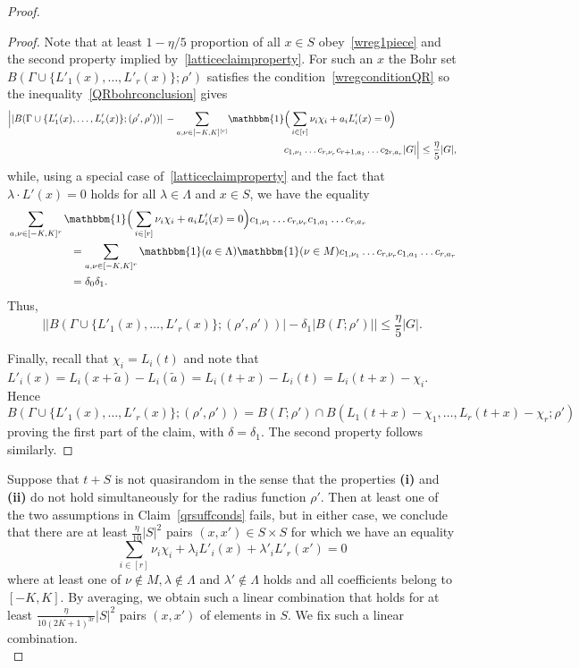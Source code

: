 \documentclass[a4paper,11pt]{article}
\numberwithin{theorem}{section}
\theoremstyle{definition}
\newcommand\id{\mathbbm{1}}
\begin{document}
\begin{proof}
\begin{proof}
Note that at least $1-\eta/5$ proportion of all $x \in S$ obey~\eqref{wreg1piece} and the second property implied by~\eqref{latticeclaimproperty}. For such an $x$ the Bohr set $B(\Gamma \cup \{L'_1(x), \dots, L'_r(x)\}; \rho')$ satisfies the condition~\eqref{wregconditionQR} so the inequality~\eqref{QRbohrconclusion} gives
\begin{align*}\Big||B(\Gamma \cup \{L'_1(x), \dots, L'_r(x)\}; (\rho', \rho'))|\, - \sum_{a, \nu \in [-K, K]^{[r]}} &\id\Big(\sum_{i \in [r]} \nu_i \chi_i + a_i L'_i(x) = 0\Big)\\
&\hspace{2cm} c_{1, \nu_1} \dots c_{r, \nu_r} c_{r+ 1, a_1} \dots c_{2r, a_r} |G|\Big| \leq \frac{\eta}{5}|G|,\end{align*}
while, using a special case of~\eqref{latticeclaimproperty} and the fact that $\lambda \cdot L'(x) = 0$ holds for all $\lambda \in \Lambda$ and $x \in S$, we have the equality
\begin{align*}&\sum_{a ,\nu\in [-K, K]^r} \id\Big(\sum_{i \in [r]} \nu_i \chi_i + a_i L'_i(x) = 0\Big) c_{1, \nu_1} \dots c_{r, \nu_r} c_{1, a_1} \dots c_{r, a_r} \\
&\hspace{2cm}=\sum_{a, \nu\in [-K, K]^r} \id(a \in \Lambda) \id(\nu \in M) c_{1, \nu_1} \dots c_{r, \nu_r} c_{1, a_1} \dots c_{r, a_r}\\
&\hspace{2cm}= \delta_0 \delta_1.\end{align*}
Thus,
\[\Big||B(\Gamma \cup \{L'_1(x), \dots, L'_r(x)\}; (\rho', \rho'))| - \delta_1|B(\Gamma; \rho')|\Big| \leq \frac{\eta}{5}|G|.\]

Finally, recall that $\chi_i = L_i(t)$ and note that $L'_i(x) = L_i(x + \tilde{a}) - L_i(\tilde{a}) = L_i(t + x) - L_i(t) = L_i(t + x) - \chi_i$. Hence
\[B(\Gamma \cup \{L'_1(x), \dots, L'_r(x)\}; (\rho', \rho')) = B(\Gamma; \rho') \cap B(L_1(t + x)-\chi_1, \dots, L_r(t + x)-\chi_r; \rho')\]
proving the first part of the claim, with $\delta = \delta_1$. The second property follows similarly.\end{proof}

Suppose that $t + S$ is not quasirandom in the sense that the properties \textbf{(i)} and \textbf{(ii)} do not hold simultaneously for the radius function $\rho'$. Then at least one of the two assumptions in Claim~\ref{qrsuffconds} fails, but in either case, we conclude that there are at least $\frac{\eta}{10}|S|^2$ pairs $(x, x') \in S \times S$ for which we have an equality
\[\sum_{i \in [r]} \nu_i \chi_i + \lambda_i L'_i(x) + \lambda'_i L'_r(x') = 0\]
where at least one of $\nu \notin M, \lambda \notin \Lambda$ and $\lambda' \notin \Lambda$ holds and all coefficients belong to $[-K, K]$. By averaging, we obtain such a linear combination that holds for at least $\frac{\eta}{10 (2K + 1)^{3r}}|S|^2$ pairs $(x,x')$ of elements in $S$. We fix such a linear combination.\\ 


\end{proof}
\end{document}

